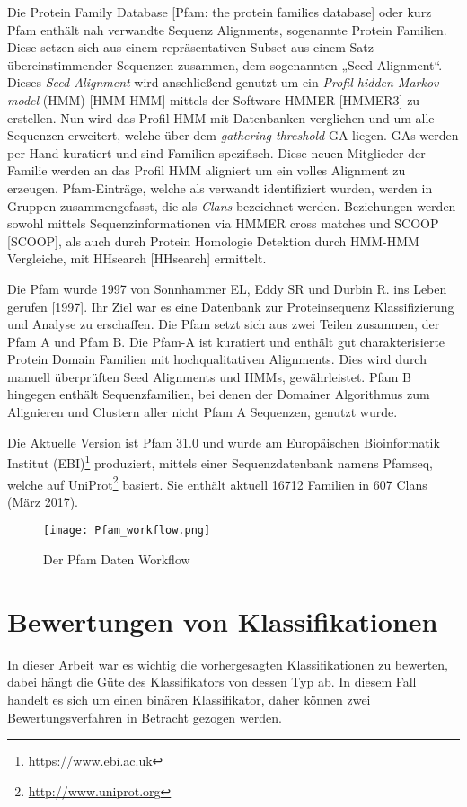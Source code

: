 Die Protein Family Database [Pfam: the protein families database] oder kurz Pfam enthält nah verwandte Sequenz Alignments, sogenannte Protein Familien. Diese setzen sich aus einem repräsentativen Subset aus einem Satz übereinstimmender Sequenzen zusammen, dem sogenannten „Seed Alignment“. Dieses \emph{Seed Alignment} wird anschließend genutzt um ein \emph{Profil hidden Markov model} (HMM) [HMM-HMM] mittels der Software HMMER [HMMER3] zu erstellen. Nun wird das Profil HMM mit Datenbanken verglichen und um alle Sequenzen erweitert, welche über dem \emph{gathering threshold} GA liegen. GAs werden per Hand kuratiert und sind Familien spezifisch. Diese neuen Mitglieder der Familie werden an das Profil HMM aligniert um ein volles Alignment zu erzeugen. Pfam-Einträge, welche als verwandt identifiziert wurden, werden in Gruppen zusammengefasst, die als \emph{Clans} bezeichnet werden. Beziehungen werden sowohl mittels Sequenzinformationen via HMMER cross matches und SCOOP [SCOOP], als auch durch Protein Homologie Detektion durch HMM-HMM Vergleiche, mit HHsearch [HHsearch] ermittelt.

Die Pfam wurde 1997 von Sonnhammer EL, Eddy SR und Durbin R. ins Leben gerufen [1997]. Ihr Ziel war es eine Datenbank zur Proteinsequenz Klassifizierung und Analyse zu erschaffen. Die Pfam setzt sich aus zwei Teilen zusammen, der Pfam A und Pfam B. Die Pfam-A ist kuratiert und enthält gut charakterisierte Protein Domain Familien mit hochqualitativen Alignments. Dies wird durch manuell überprüften Seed Alignments und HMMs, gewährleistet. Pfam B hingegen enthält Sequenzfamilien, bei denen der Domainer Algorithmus zum Alignieren und Clustern aller nicht Pfam A Sequenzen, genutzt wurde. 

Die Aktuelle Version ist Pfam 31.0 und wurde am Europäischen Bioinformatik Institut (EBI)\footnote{\url{https://www.ebi.ac.uk}} produziert, mittels einer Sequenzdatenbank namens Pfamseq, welche auf UniProt\footnote{\url{http://www.uniprot.org}} basiert. Sie enthält aktuell 16712 Familien in 607 Clans (März 2017).
\begin{figure}
\texttt{[image: Pfam\_workflow.png]}
\caption{Der Pfam Daten Workflow }
\label{fig:Pfam_workflow}
\end{figure}


\section{Bewertungen von Klassifikationen}

In dieser Arbeit war es wichtig die vorhergesagten Klassifikationen zu bewerten, dabei hängt die Güte des Klassifikators von dessen Typ ab. In diesem Fall handelt es sich um einen binären Klassifikator, daher können zwei Bewertungsverfahren in Betracht gezogen werden.


